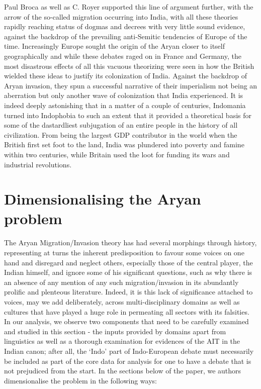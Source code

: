 Paul Broca as well as C. Royer supported this line of argument further, with the arrow of the so-called migration occurring into India, with all these theories rapidly reaching status of dogmas and decrees with very little sound evidence, against the backdrop of the prevailing anti-Semitic tendencies of Europe of the time. Increasingly Europe sought the origin of the Aryan closer to itself geographically and while these debates raged on in France and Germany, the most disastrous effects of all this vacuous theorizing were seen in how the British wielded these ideas to justify its colonization of India. Against the backdrop of Aryan invasion, they spun a successful narrative of their imperialism not being an aberration but only another wave of colonization that India experienced. It is indeed deeply astonishing that in a matter of a couple of centuries, Indomania turned into Indophobia to such an extent that it provided a theoretical basis for some of the dastardliest subjugation of an entire people in the history of all civilization. From being the largest GDP contributor in the world when the British first set foot to the land, India was plundered into poverty and famine within two centuries, while Britain used the loot for funding its wars and industrial revolutions.


\section{Dimensionalising the Aryan problem}

The Aryan Migration/Invasion theory has had several morphings through history, representing at turns the inherent predisposition to favour some voices on one hand and disregard and neglect others, especially those of the central player, the Indian himself, and ignore some of his significant questions, such as why there is an absence of any mention of any such migration/invasion in its abundantly prolific and plenteous literature. Indeed, it is this lack of significance attached to voices, may we add deliberately, across multi-disciplinary domains as well as cultures that have played a huge role in permeating all sectors with its falsities. In our analysis, we observe two components that need to be carefully examined and studied in this section - the inputs provided by domains apart from linguistics as well as a thorough examination for evidences of the AIT in the Indian canon; after all, the ‘Indo’ part of Indo-European debate must necessarily be included as part of the core data for analysis for one to have a debate that is not prejudiced from the start. In the sections below of the paper, we authors dimensionalise the problem in the following ways:

